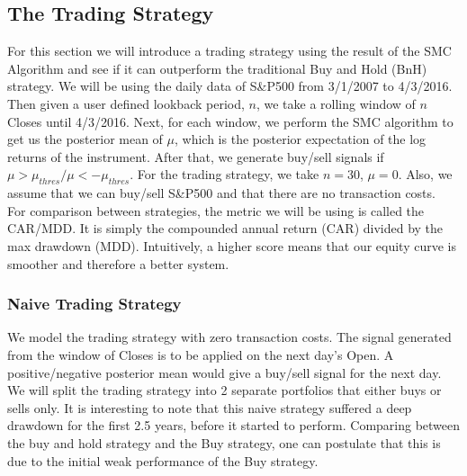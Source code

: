 \documentclass[12pt]{article}
\theoremstyle{definition}
\begin{document}
\subsection{The Trading Strategy}
For this section we will introduce a trading strategy using the result of the SMC Algorithm and see if it can outperform the traditional Buy and Hold (BnH) strategy. We will be using the daily data of S\&P500 from 3/1/2007 to 4/3/2016. Then given a user defined lookback period, $n$, we take a rolling window of $n$ Closes until 4/3/2016. Next, for each window, we perform the SMC algorithm to get us the posterior mean of $\mu$, which is the posterior expectation of the log returns of the instrument. After that, we generate buy/sell signals if $\mu>\mu_{thres}/\mu<-\mu_{thres}$. For the trading strategy, we take $n=30$, $\mu=0$. Also, we assume that we can buy/sell S\&P500 and that there are no transaction costs.\\
For comparison between strategies, the metric we will be using is called the CAR/MDD. It is simply the compounded annual return (CAR) divided by the max drawdown (MDD). Intuitively, a higher score means that our equity curve is smoother and therefore a better system.

\subsubsection{Naive Trading Strategy}

We model the trading strategy with zero transaction costs. The signal generated from the window of Closes is to be applied on the next day's Open. A positive/negative posterior mean would give a buy/sell signal for the next day. We will split the trading strategy into 2 separate portfolios that either buys or sells only. It is interesting to note that this naive strategy suffered a deep drawdown for the first 2.5 years, before it started to perform. Comparing between the buy and hold strategy and the Buy strategy, one can postulate that this is due to the initial weak performance of the Buy strategy.
\end{document}
